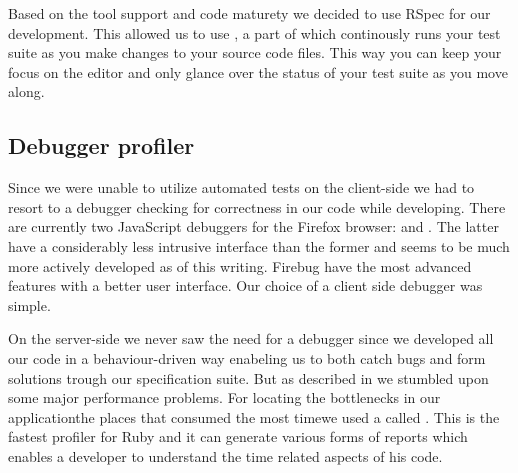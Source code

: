 Based on the tool support and code maturety we decided to use RSpec for our
development. This allowed us to use , a part of
%
which continously runs your test suite as you make changes to your source code
files. This way you can keep your focus on the editor and only glance over the
status of your test suite as you move along.

\subsection{Debugger \oldand profiler}

Since we were unable to utilize automated tests on the client-side we had to
resort to a debugger checking for correctness in our code while developing.
There are currently two JavaScript debuggers for the Firefox browser:
%
and %
.
The latter have a considerably less intrusive interface than the former and
seems to be much more actively developed as of this writing. Firebug have the
most advanced features with a better user interface. Our choice of a client
side debugger was simple.

On the server-side we never saw the need for a debugger since we developed all
our code in a behaviour-driven way enabeling us to both catch bugs and form
solutions trough our specification suite. But as described in
 we stumbled upon some major
performance problems. For locating the bottlenecks in our
application\dash{}the places that consumed the most time\dash{}we used
a %
called %
.
This is the fastest profiler for Ruby and it can generate various forms of
reports which enables a developer to understand the time related aspects of
his code.
